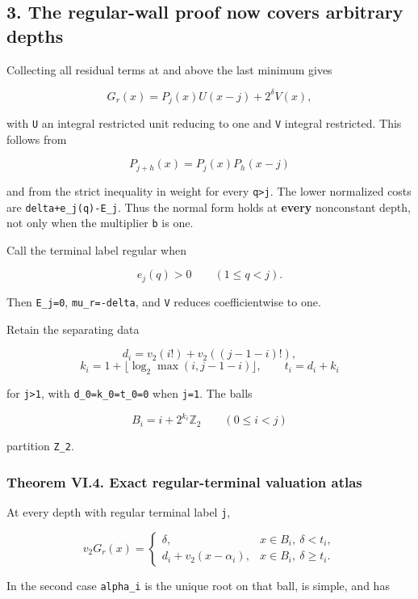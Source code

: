 \documentclass[11pt,letterpaper]{article}
\begin{document}
\subsection{3. The regular-wall proof now covers arbitrary depths}\label{the-regular-wall-proof-now-covers-arbitrary-depths}

Collecting all residual terms at and above the last minimum gives

\[
\boxed{G_r(x)=P_j(x)U(x-j)+2^\delta V(x),} \tag{VI.8}
\]

with \texttt{U} an integral restricted unit reducing to one and \texttt{V} integral restricted. This follows from

\[
P_{j+h}(x)=P_j(x)P_h(x-j)
\]

and from the strict inequality in weight for every \texttt{q\textgreater{}j}. The lower normalized costs are \texttt{delta+e\_j(q)-E\_j}. Thus the normal form holds at \textbf{every} nonconstant depth, not only when the multiplier \texttt{b} is one.

Call the terminal label regular when

\[
e_j(q)>0\qquad(1\le q<j).
\]

Then \texttt{E\_j=0}, \texttt{mu\_r=-delta}, and \texttt{V} reduces coefficientwise to one.

Retain the separating data

\[
d_i=v_2(i!)+v_2((j-1-i)!),
\] \[
k_i=1+\lfloor\log_2\max(i,j-1-i)\rfloor,
\qquad t_i=d_i+k_i
\]

for \texttt{j\textgreater{}1}, with \texttt{d\_0=k\_0=t\_0=0} when \texttt{j=1}. The balls

\[
B_i=i+2^{k_i}\mathbb Z_2\qquad(0\le i<j)
\]

partition \texttt{Z\_2}.

\subsubsection{Theorem VI.4. Exact regular-terminal valuation atlas}\label{theorem-vi.4.-exact-regular-terminal-valuation-atlas}

At every depth with regular terminal label \texttt{j},

\[
\boxed{v_2G_r(x)=
\begin{cases}
\delta,&x\in B_i,\ \delta<t_i,\\
d_i+v_2(x-\alpha_i),&x\in B_i,\ \delta\ge t_i.
\end{cases}} \tag{VI.9}
\]

In the second case \texttt{alpha\_i} is the unique root on that ball, is simple, and has
\end{document}
